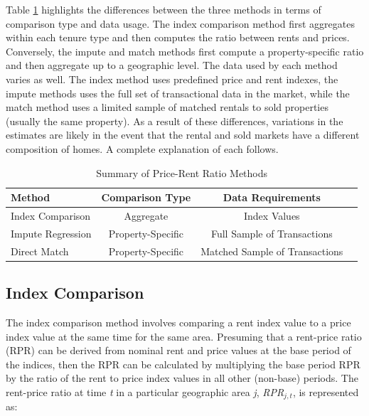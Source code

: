 \documentclass{article}\usepackage[]{graphicx}\usepackage[]{color}
\begin{document}
Table \ref{table:summeth} highlights the differences between the three methods in terms of comparison type and data usage. The index comparison method first aggregates within each tenure type and then computes the ratio between rents and prices.  Conversely, the impute and match methods first compute a property-specific ratio and then aggregate up to a geographic level. The data used by each method varies as well.  The index method uses predefined price and rent indexes, the impute methods uses the full set of transactional data in the market, while the match method uses a limited sample of matched rentals to sold properties (usually the same property). As a result of these differences, variations in the estimates are likely in the event that the rental and sold markets have a different composition of homes. A complete explanation of each follows.\par 

\begin{table}[ht]
 \centering
 \caption {Summary of Price-Rent Ratio Methods}
 \footnotesize
 \label{table:summeth}
 \begin{tabular}{lccc}
   \hline
   \hline
   \textbf{Method} & \textbf{Comparison Type} & \textbf{Data Requirements}\\
   \hline
   Index Comparison & Aggregate & Index Values\\
   Impute Regression & Property-Specific & Full Sample of Transactions\\
   Direct Match & Property-Specific & Matched Sample of Transactions\\
   \hline
   \hline
  \end{tabular}
\end{table}

\subsection*{Index Comparison}
  
The index comparison method involves comparing a rent index value to a price index value at the same time for the same area.  Presuming that a rent-price ratio (RPR) can be derived from nominal rent and price values at the base period of the indices, then the RPR can be calculated by multiplying the base period RPR by the ratio of the rent to price index values in all other (non-base) periods. The rent-price ratio at time \textit{t} in a particular geographic area \textit{j},  \textit{RPR$_{j, t}$}, is represented as:\par
  
\end{document}
